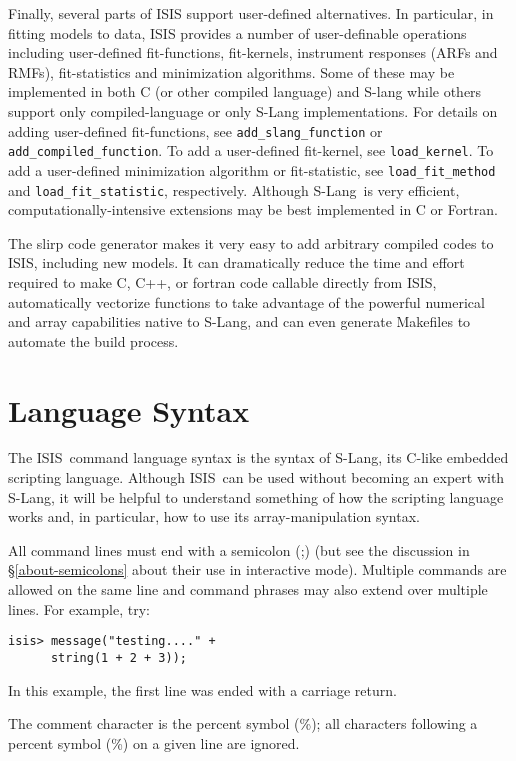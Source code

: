 \documentclass{book}
\newcommand{\isisx}{{\sc ISIS~}}
\newcommand{\isis}{{\sc ISIS}}
\newcommand{\slang}{{\sc S-Lang}}
\begin{document}
Finally, several parts of ISIS support user-defined
alternatives. In particular, in fitting models to data, ISIS
provides a number of user-definable operations including
user-defined fit-functions, fit-kernels, instrument responses
(ARFs and RMFs), fit-statistics and minimization algorithms.
Some of these may be implemented in both C (or other compiled
language) and S-lang while others support only
compiled-language or only S-Lang implementations. For details
on adding user-defined fit-functions, see
\verb|add_slang_function| or \verb|add_compiled_function|. To
add a user-defined fit-kernel, see \verb|load_kernel|. To add a
user-defined minimization algorithm or fit-statistic, see
\verb|load_fit_method| and \verb|load_fit_statistic|,
respectively. Although \slang\ is very efficient,
computationally-intensive extensions may be best implemented in
C or Fortran.

The {\sc slirp} code generator makes it very easy to add
arbitrary compiled codes to \isis, including new models.  It
can dramatically reduce the time and effort required to make C,
C++, or {\sc fortran} code callable directly from \isis,
automatically vectorize functions to take advantage of the
powerful numerical and array capabilities native to \slang, and
can even generate Makefiles to automate the build process.

\section{Language Syntax}

The \isisx command language syntax is the syntax of \slang, its
C-like embedded scripting language. Although \isisx can be used
without becoming an expert with \slang, it will be helpful to
understand something of how the scripting language works and, in
particular, how to use its array-manipulation syntax.

All command lines must end with a semicolon (;) (but see the
discussion in \S\ref{about-semicolons} about their use in
interactive mode). Multiple commands are allowed on the same line
and command phrases may also extend over multiple lines.  For
example, try:
\begin{verbatim}
isis> message("testing...." +
      string(1 + 2 + 3));
\end{verbatim}
In this example, the first line was ended with a carriage return.

The comment character is the percent symbol (\%);  all characters
following a percent symbol (\%) on a given line are ignored.
\end{document}
